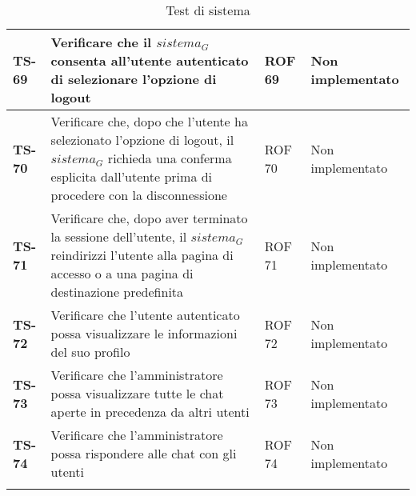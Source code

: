 \begin{longtable}{|>{\centering\arraybackslash}p{1.5cm}|p{9.8cm}|p{2cm}|p{3.5cm}|}
    \hline
    \rowcolor{gray!10}
    \textbf{TS-69} & Verificare che il $\textit{sistema}_G$ consenta all'utente autenticato di selezionare l'opzione di logout & ROF 69 & Non implementato \\
    \hline
    \rowcolor{gray!10}
    \textbf{TS-70} & Verificare che, dopo che l'utente ha selezionato l'opzione di logout, il $\textit{sistema}_G$ richieda una conferma esplicita dall'utente prima di procedere con la disconnessione & ROF 70 & Non implementato \\ 
    \hline
    \rowcolor{gray!10}
    \textbf{TS-71} & Verificare che, dopo aver terminato la sessione dell'utente, il $\textit{sistema}_G$ reindirizzi l'utente alla pagina di accesso o a una pagina di destinazione predefinita & ROF 71 & Non implementato \\ 
    \hline
    \rowcolor{gray!10}
    \textbf{TS-72} & Verificare che l'utente autenticato possa visualizzare le informazioni del suo profilo & ROF 72 & Non implementato \\ 
    \hline
    \rowcolor{gray!10}
    \textbf{TS-73} & Verificare che l'amministratore possa visualizzare tutte le chat aperte in precedenza da altri utenti& ROF 73 & Non implementato \\ 
    \hline
    \rowcolor{gray!10}
    \textbf{TS-74} & Verificare che l'amministratore possa rispondere alle chat con gli utenti & ROF 74 & Non implementato \\ 
    \hline
    \caption{Test di sistema} 
    \label{tab:test_sistema}
    \end{longtable}
    
